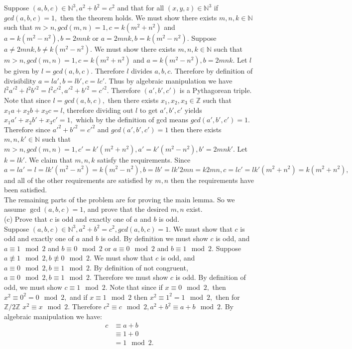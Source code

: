 \documentclass[12pt, letterpaper]{article}
\newcommand{\Z}{\mathbb{Z}}
\newcommand{\N}{\mathbb{N}}
\begin{document}
Suppose $(a,b,c) \in \N^3, a^2 + b^2 = c^2$ and that for all $(x,y,z) \in \N^3$ if $gcd(a,b,c) = 1,$ then the theorem holds.  We must show there exists $m,n,k \in \N$ such that $m > n, gcd(m,n) = 1, c = k(m^2 + n^2)$ and $a = k(m^2 - n^2), b = 2mnk$ or $a = 2mnk,b = k(m^2 - n^2)$.  Suppose $a \neq 2mnk, b \neq k(m^2 - n^2).$  We must show there exists $m,n,k \in \N$ such that $m > n, gcd(m,n) = 1, c = k(m^2 + n^2)$ and $a = k(m^2 - n^2), b = 2mnk$.  Let $l$ be given by $l = gcd(a,b,c).$  Therefore $l$ divides $a,b,c$.  Therefore by definition of divisibility $a = la', b= lb', c = lc'.$  Thus by algebraic manipulation we have $l^2 a'^2 + l^2 b'^2 = l^2 c'^2, a'^2 + b'^2 = c'^2.$  Therefore $(a',b',c')$ is a Pythagorean triple.  Note that since $l = gcd(a,b,c),$ then there exists $x_1, x_2, x_3 \in \Z$ such that $x_1 a + x_2 b + x_3 c = l$, therefore dividing out $l$ to get $a',b',c'$ yields $x_1 a' + x_2 b' + x_3 c' = 1,$ which by the definition of gcd means $gcd(a',b',c') = 1.$  Therefore since $a'^2 + b'^2 = c'^2$ and $gcd(a',b',c') = 1$ then there exists $m,n,k' \in \N$ such that $m > n, gcd(m,n) = 1, c' = k'(m^2 + n^2),  a' = k'(m^2 - n^2), b' = 2mnk'.$  Let $k = lk'.$  We claim that $m,n,k$ satisfy the requirements.  Since $a = la' = l = lk'(m^2 - n^2) = k(m^2 - n^2), b = lb' = lk'2mn = k2mn, c = lc' = lk'(m^2 + n^2) = k(m^2 + n^2),$ and all of the other requirements are satisfied by $m,n$ then the requirements have been satisfied.
\\


The remaining parts of the problem are for proving the main lemma. So we assume 
$\gcd(a,b,c)=1$, and prove
that the desired $m,n$ exist. \\


(c) Prove that $c$ is odd and exactly one of $a$ and $b$ is odd. \\ 
Suppose $(a,b,c) \in \N^3, a^2 + b^2 = c^2, gcd(a,b,c) = 1.$  We must show that $c$ is odd and exactly one of $a$ and $b$ is odd.  By definition we must show $c$ is odd, and $a \equiv 1 \mod 2$ and $b \equiv 0 \mod 2$ or $a \equiv 0 \mod 2$ and $b \equiv 1 \mod 2$.  Suppose $a \not\equiv 1 \mod 2, b \not \equiv 0 \mod 2.$  We must show that $c$ is odd, and $a \equiv 0 \mod 2, b \equiv 1 \mod 2$.  By definition of not congruent, $a \equiv 0 \mod 2, b \equiv 1 \mod 2.$  Therefore we must show $c$ is odd.  By definition of odd, we must show $c \equiv 1 \mod 2.$ Note that since if $x \equiv 0 \mod 2,$ then $x^2 \equiv 0^2 = 0 \mod 2,$ and if $x \equiv 1 \mod 2$ then $x^2 \equiv 1^2 = 1 \mod 2,$ then for $\Z / 2 \Z$ $x^2 \equiv x \mod 2.$  Therefore $c^2 \equiv c \mod 2, a^2 + b^2 \equiv a + b \mod 2.$ By algebraic manipulation we have: \begin{align*}
	c &\equiv a + b\\
	&\equiv 1 + 0\\
	&= 1 \mod 2.
\end{align*}
\end{document}
